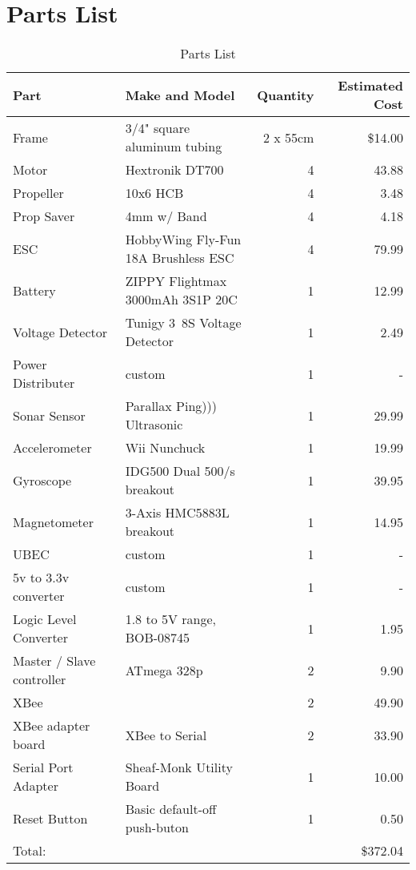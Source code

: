 \section{Parts List}
\setcounter{table}{0}
\renewcommand*\thetable{\Alph{section}.\arabic{table}}
\begin{table}[htpb]
\begin{center}
\caption{Parts List}
\begin{tabular}{|l|l|r|r|}
\hline

Part & Make and Model & Quantity &Estimated Cost\\ \hline \hline 
Frame & 3/4" square aluminum tubing & 2 x 55cm & \$14.00\\ \hline
Motor &	Hextronik DT700 & 4 & 43.88\\ \hline
Propeller & 10x6 HCB & 4 & 3.48\\ \hline
Prop Saver & 4mm w/ Band & 4 & 4.18\\ \hline
ESC & HobbyWing Fly-Fun 18A Brushless ESC & 4 & 79.99\\ \hline
Battery & ZIPPY Flightmax 3000mAh 3S1P 20C & 1 & 12.99\\ \hline
Voltage Detector & Tunigy 3~8S Voltage Detector & 1 & 2.49\\ \hline
Power Distributer & custom & 1 & -\\ \hline
Sonar Sensor & Parallax Ping))) Ultrasonic & 1 & 29.99\\ \hline
Accelerometer & Wii Nunchuck & 1 & 19.99\\ \hline
Gyroscope & IDG500 Dual 500/s breakout & 1 & 39.95\\ \hline
Magnetometer & 3-Axis HMC5883L breakout & 1 & 14.95\\ \hline
UBEC & custom & 1 & -\\ \hline
5v to 3.3v converter & custom & 1 & -\\ \hline
Logic Level Converter & 1.8 to 5V range, BOB-08745& 1 & 1.95\\ \hline
Master / Slave controller & ATmega 328p & 2 & 9.90\\ \hline
XBee &  & 2 & 49.90\\ \hline
XBee adapter board & XBee to Serial & 2 & 33.90\\ \hline
Serial Port Adapter & Sheaf-Monk Utility Board & 1 & 10.00\\ \hline
Reset Button & Basic default-off push-buton & 1 & 0.50\\ \hline \hline
Total:&&& \$372.04\\ \hline
\end{tabular}
\end{center}
\end{table}
